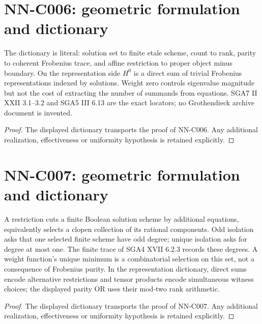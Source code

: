 \section{NN-C006: geometric formulation and dictionary}
\begin{geometricstatement}[NN-C006]
The dictionary is literal: solution set to finite etale scheme, count to rank, parity to coherent Frobenius trace, and affine restriction to proper object minus boundary. On the representation side $H^0$ is a direct sum of trivial Frobenius representations indexed by solutions. Weight zero controls eigenvalue magnitude but not the cost of extracting the number of summands from equations. SGA7 II XXII 3.1--3.2 and SGA5 III 6.13 are the exact locators; no Grothendieck archive document is invented.
\end{geometricstatement}
\begin{proof} The displayed dictionary transports the proof of NN-C006. Any additional realization, effectiveness or uniformity hypothesis is retained explicitly.\end{proof}


\section{NN-C007: geometric formulation and dictionary}
\begin{geometricstatement}[NN-C007]
A restriction cuts a finite Boolean solution scheme by additional equations, equivalently selects a clopen collection of its rational components. Odd isolation asks that one selected finite scheme have odd degree; unique isolation asks for degree at most one. The finite trace of SGA4 XVII 6.2.3 records these degrees. A weight function's unique minimum is a combinatorial selection on this set, not a consequence of Frobenius purity. In the representation dictionary, direct sums encode alternative restrictions and tensor products encode simultaneous witness choices; the displayed parity OR uses their mod-two rank arithmetic.
\end{geometricstatement}
\begin{proof} The displayed dictionary transports the proof of NN-C007. Any additional realization, effectiveness or uniformity hypothesis is retained explicitly.\end{proof}



